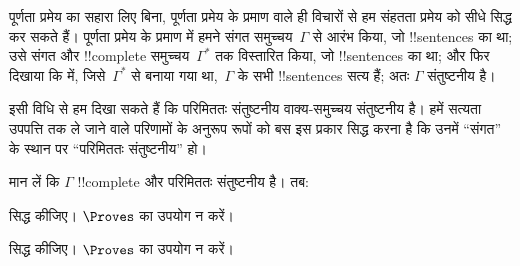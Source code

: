 \documentclass[../../../include/open-logic-section]{subfiles}
\begin{document}
      {}
      {}


पूर्णता प्रमेय का सहारा लिए बिना, पूर्णता प्रमेय के प्रमाण वाले ही विचारों
से हम संहतता प्रमेय को सीधे सिद्ध कर सकते हैं। पूर्णता प्रमेय के प्रमाण में
हमने संगत समुच्चय~$\Gamma$ से आरंभ किया, जो !!{sentence}s का था; उसे
संगत और !!{complete} समुच्चय~$\Gamma^*$ तक
विस्तारित किया, जो !!{sentence}s का था; और फिर दिखाया कि
में, जिसे~$\Gamma^*$ से बनाया गया था,~$\Gamma$ के सभी !!{sentence}s सत्य
हैं; अतः $\Gamma$ संतुष्टनीय है।

इसी विधि से हम दिखा सकते हैं कि परिमिततः संतुष्टनीय वाक्य-समुच्चय
संतुष्टनीय है। हमें सत्यता उपपत्ति तक ले जाने वाले परिणामों के अनुरूप रूपों
को बस इस प्रकार सिद्ध करना है कि उनमें ``संगत'' के स्थान पर ``परिमिततः
संतुष्टनीय'' हो।

\begin{prop}
मान लें कि $\Gamma$ !!{complete} और परिमिततः संतुष्टनीय है। तब:
\begin{enumerate}


\end{enumerate}
\end{prop}

\begin{prob}
 सिद्ध कीजिए। $\Proves$ का उपयोग न करें।
\end{prob}
\tagendprob

\begin{prob}
 सिद्ध कीजिए। $\Proves$ का उपयोग न करें।
\end{prob}
\tagendprob

\end{document}
